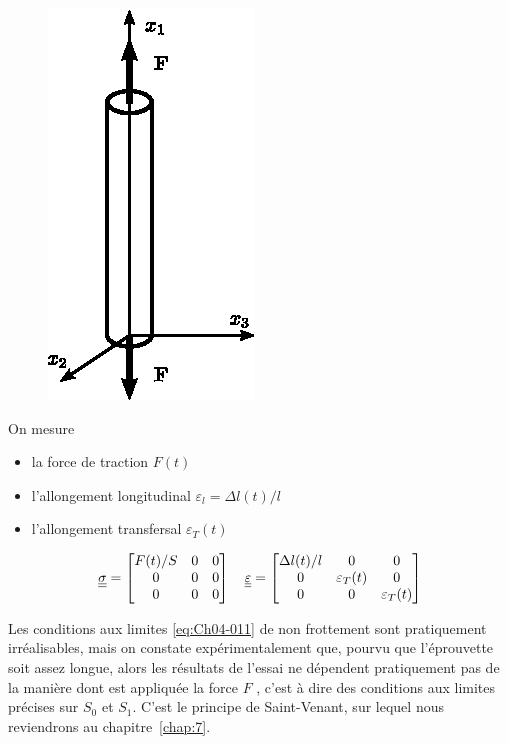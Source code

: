 \begin{figure}
    \begin{center}
        \includegraphics{../images/T1_Ch04-0007}
    \end{center}
\end{figure}
On mesure 
\begin{itemize}
    \item la force de traction $F(t)$
    \item l'allongement longitudinal $\varepsilon_{l} = \Delta l(t)/l$
    \item l'allongement transfersal $\varepsilon_T(t)$
\end{itemize}
\begin{equation}
    \underline{\underline{\sigma}} =
    \begin{bmatrix}
        F(t)/S & 0 & 0 \\
        0 & 0 & 0 \\
        0 & 0 & 0
    \end{bmatrix}
    \quad
    \underline{\underline{\varepsilon}} = 
    \begin{bmatrix}
        \Delta l(t)/l & 0 & 0 \\
        0 & \varepsilon_T(t) & 0 \\
        0 & 0 & \varepsilon_T(t)
    \end{bmatrix}
    \label{eq:Ch04-035}
\end{equation}

Les conditions aux limites \eqref{eq:Ch04-011} de non frottement sont pratiquement irréalisables, mais on constate expérimentalement que, pourvu que l'éprouvette soit assez longue, alors les résultats de l'essai ne dépendent pratiquement pas de la manière dont est appliquée la force $F$ , c'est à dire des conditions aux limites précises sur $S_0$ et $S_1$.
C'est le principe de Saint-Venant, sur lequel nous reviendrons au chapitre~\ref{chap:7}.

